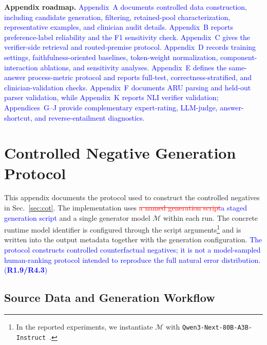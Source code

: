 \documentclass[a4paper,fleqn,doubleblind]{cas-sc}
\DeclareRobustCommand{\deleted}[1]{\textcolor{red}{\sout{#1}}}
\DeclareRobustCommand{\added}[1]{\textcolor{blue}{#1}}
\DeclareRobustCommand{\revtag}[1]{\textcolor{blue}{\scriptsize\,(\textbf{#1})}}
\begin{document}
\appendix

\noindent\textbf{Appendix roadmap.}
\added{Appendix~A documents controlled data construction, including candidate generation, filtering, retained-pool characterization, representative examples, and clinician audit details. Appendix~B reports preference-label reliability and the F1 sensitivity check. Appendix~C gives the verifier-side retrieval and routed-premise protocol. Appendix~D records training settings, faithfulness-oriented baselines, token-weight normalization, component-interaction ablations, and sensitivity analyses. Appendix~E defines the same-answer process-metric protocol and reports full-test, correctness-stratified, and clinician-validation checks. Appendix~F documents ARU parsing and held-out parser validation, while Appendix~K reports NLI verifier validation; Appendices~G--J provide complementary expert-rating, LLM-judge, answer-shortcut, and reverse-entailment diagnostics.}
\section{Controlled Negative Generation Protocol}
\label{app:negative_protocol}

This appendix documents the protocol used to construct the controlled negatives in Sec.~\ref{sec:cot}. The implementation uses \deleted{a named generation script}\added{a staged generation script} and a single generator model $\mathcal{M}$ within each run. The concrete runtime model identifier is configured through the script arguments\footnote{In the reported experiments, we instantiate $\mathcal{M}$ with \texttt{Qwen3-Next-80B-A3B-Instruct}~\cite{yang2025qwen3}.} and is written into the output metadata together with the generation configuration. \added{The protocol constructs controlled counterfactual negatives; it is not a model-sampled human-ranking protocol intended to reproduce the full natural error distribution.}\revtag{R1.9/R4.3}

\subsection{Source Data and Generation Workflow}
\end{document}
